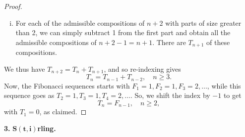 \documentclass[11pt]{article}
\begin{document}
\begin{enumerate}[(a)]
\begin{proof}
\begin{enumerate}[(i)]
			
			\item For each of the admissible compositions of $n+2$ with parts of size greater than 2, we can simply subtract 1 from the first part and obtain all the admissible compositions of $n+2-1=n+1$. There are $T_{n+1}$ of these compositions.
		\end{enumerate}
		
		  We thus have $T_{n+2} = T_n + T_{n+1}$, and so re-indexing gives
		\begin{equation*}
		T_n = T_{n-1} + T_{n-2}, \quad n\geq 3.
		\end{equation*} 
		Now, the Fibonacci sequences starts with $F_1 = 1, F_2 = 1, F_3 = 2,\dots$, while this sequence goes as $T_2 = 1, T_3 = 1, T_4 = 2, \dots$. So, we shift the index by $-1$ to get
		\begin{equation*}
		T_n = F_{n-1}, \quad n \geq 2, 
		\end{equation*}
		with $T_1= 0$, as claimed. 
	\end{proof}


\end{enumerate}



\newpage



\noindent \textbf{3.} \textbf{$\mathbf{S(t,i)}$rling.}
\end{document}
